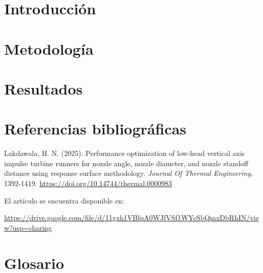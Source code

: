 \documentclass[12pt,letterpaper]{article}
\newif\ifportada
\newif\ifindice
\begin{document}
\ifportada
  
  \newpage
\fi

\ifindice
  \renewcommand{\contentsname}{Tabla de contenido}
  \tableofcontents
  \newpage
\fi

\tituloarticulo



\section{Introducción}
\label{sec:introduccion}


\section{Metodología}
\label{sec:metodologia}


\section{Resultados}
\label{sec:resultados}


% 
%

\FloatBarrier
  


\section{Referencias bibliográficas}

Lakdawala, H. N. (2025). Performance optimization of low-head vertical axis impulse turbine runners for nozzle angle, nozzle diameter, and nozzle standoff distance using response surface methodology. \textit{Journal Of Thermal Engineering}, 1392-1419. \url{https://doi.org/10.14744/thermal.0000983}

El artículo se encuentra disponible en:

\url{https://drive.google.com/file/d/11gxh1VBlpA0WJfVSf1WYcSbQmxDbRhIN/view?usp=sharing}

\appendix
\section{Glosario}
\label{sec:glosario}

\end{document}

